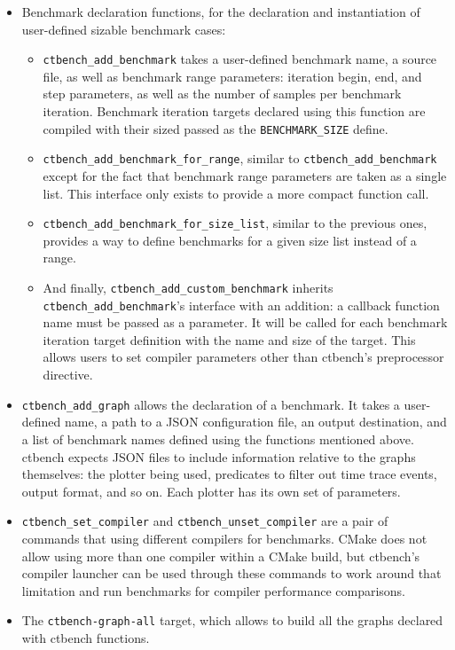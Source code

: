 \documentclass[../main]{subfiles}
\begin{document}
\begin{itemize}

\item Benchmark declaration functions, for the declaration and instantiation
of user-defined sizable benchmark cases:

  \begin{itemize}

  \item
  \lstinline{ctbench_add_benchmark} takes a user-defined benchmark name,
  a \cpp source file, as well as benchmark range parameters: iteration begin,
  end, and step parameters, as well as the number of samples per benchmark
  iteration. Benchmark iteration targets declared using this function are
  compiled with their sized passed as the \lstinline{BENCHMARK_SIZE} define.

  \item
  \lstinline{ctbench_add_benchmark_for_range}, similar to
  \lstinline{ctbench_add_benchmark} except for the fact that benchmark range
  parameters are taken as a single list. This interface only exists to provide
  a more compact function call.

  \item
  \lstinline{ctbench_add_benchmark_for_size_list}, similar to the previous ones,
  provides a way to define benchmarks for a given size list instead of a range.

  \item
  And finally, \lstinline{ctbench_add_custom_benchmark} inherits
  \lstinline{ctbench_add_benchmark}'s interface with an addition:
  a callback function name must be passed as a parameter. It will be called
  for each benchmark iteration target definition with the name and size of the
  target. This allows users to set compiler parameters other than ctbench's
  preprocessor directive.

  \end{itemize}

\item
\lstinline{ctbench_add_graph} allows the declaration of a benchmark.
It takes a user-defined name, a path to a JSON configuration file,
an output destination, and a list of benchmark names defined using the
functions mentioned above. ctbench expects JSON files to include information
relative to the graphs themselves: the plotter being used, predicates
to filter out time trace events, output format, and so on.
Each plotter has its own set of parameters.

\item
\lstinline{ctbench_set_compiler} and \lstinline{ctbench_unset_compiler}
are a pair of commands that using different compilers for benchmarks.
CMake does not allow using more than one compiler within a CMake build,
but ctbench's compiler launcher can be used through these commands
to work around that limitation and run benchmarks for compiler performance
comparisons.

\item
The \lstinline{ctbench-graph-all} target, which allows to build all the graphs
declared with ctbench functions.

\end{itemize}
\end{document}
